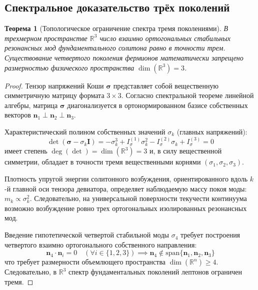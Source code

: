 \documentclass[12pt,a4paper]{article}
\newtheorem{theorem}{Теорема}
\begin{document}
	\subsection{Спектральное доказательство трёх поколений}
	\begin{theorem}[Топологическое ограничение спектра тремя поколениями]
		В трехмерном пространстве $\mathbb{R}^3$ число взаимно ортогональных стабильных резонансных мод фундаментального солитона равно в точности трем. Существование четвертого поколения фермионов математически запрещено размерностью физического пространства $\dim(\mathbb{R}^3) = 3$.
	\end{theorem}
	
	\begin{proof}
		Тензор напряжений Коши $\boldsymbol{\sigma}$ представляет собой вещественную симметричную матрицу формата $3 \times 3$. Согласно спектральной теореме линейной алгебры, матрица $\boldsymbol{\sigma}$ диагонализуется в ортонормированном базисе собственных векторов $\mathbf{n}_1 \perp \mathbf{n}_2 \perp \mathbf{n}_3$. 
		
		Характеристический полином собственных значений $\sigma_k$ (главных напряжений):
		\begin{equation}
			\det(\boldsymbol{\sigma} - \sigma_k \mathbf{I}) = -\sigma_k^3 + I_\sigma^{(1)} \sigma_k^2 - I_\sigma^{(2)} \sigma_k + I_\sigma^{(3)} = 0
		\end{equation}
		имеет степень $\deg(\det) = \dim(\mathbb{R}^3) = 3$ и, в силу вещественной симметрии, обладает в точности тремя вещественными корнями $(\sigma_1, \sigma_2, \sigma_3)$.
		
		Плотность упругой энергии солитонного возбуждения, ориентированного вдоль $k$-й главной оси тензора девиатора, определяет наблюдаемую массу покоя моды: $m_k \propto \sigma_k^2$. Следовательно, на универсальной поверхности текучести континуума возможно возбуждение ровно трех ортогональных изолированных резонансных мод. 
		
		Введение гипотетической четвертой стабильной моды $\sigma_4$ требует построения четвертого взаимно ортогонального собственного направления:
		\begin{equation}
			\mathbf{n}_4 \cdot \mathbf{n}_i = 0 \quad (\forall i \in \{1, 2, 3\}) \implies \mathbf{n}_4 \notin \mathrm{span}\{\mathbf{n}_1, \mathbf{n}_2, \mathbf{n}_3\}
		\end{equation}
		что требует размерности объемлющего пространства $\dim(\mathbb{R}^n) \ge 4$. Следовательно, в $\mathbb{R}^3$ спектр фундаментальных поколений лептонов ограничен тремя.
	\end{proof}
	
\end{document}

